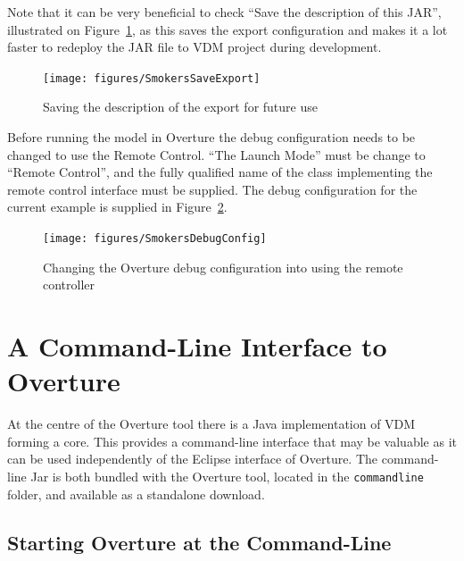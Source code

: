 \documentclass{overturerepchap}
\begin{document}
Note that it can be very beneficial to check ``Save the description of this JAR'', illustrated on Figure~\ref{fig:gui:SaveExport}, as this saves the export configuration and makes it a lot faster to redeploy the JAR file to VDM project during development.

\begin{figure}[h]
\begin{center}
  \texttt{[image: figures/SmokersSaveExport]}
  \caption[labelInTOC]{Saving the description of the export for future use}
  \label{fig:gui:SaveExport}
\end{center}
\end{figure}

Before running the model in Overture the debug configuration needs to be changed to use the Remote Control. ``The Launch Mode'' must be change to ``Remote Control'', and the fully qualified name of the class implementing the remote control interface must be supplied. The debug configuration for the current example is supplied in Figure~\ref{fig:gui:DebugConfiguration}.

\begin{figure}[h]
\begin{center}
  \texttt{[image: figures/SmokersDebugConfig]}
  \caption[labelInTOC]{Changing the Overture debug configuration into using the remote controller}
  \label{fig:gui:DebugConfiguration}
\end{center}
\end{figure}






\chapter{A Command-Line Interface to Overture}\label{sec:commandline}

At the centre of the Overture tool there is a Java implementation of VDM
forming a core. This provides a command-line interface that may be valuable
as it can be used independently of the Eclipse interface of Overture. The command-line Jar is both bundled with the Overture tool, located in the \texttt{commandline} folder, and available as a standalone download.

\section{Starting Overture at the Command-Line}
\end{document}
